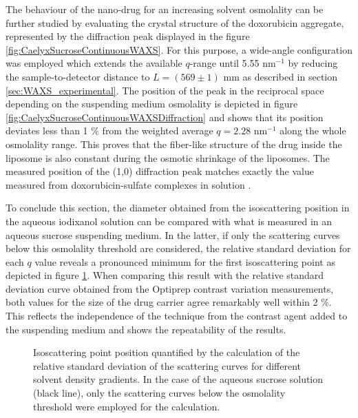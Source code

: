 The behaviour of the nano-drug for an increasing solvent osmolality can be further studied by evaluating the crystal structure of the doxorubicin aggregate, represented by the diffraction peak displayed in the figure \ref{fig:CaelyxSucroseContinuousWAXS}. For this purpose, a wide-angle configuration was employed which extends the available $q$-range until 5.55 nm$^{-1}$ by reducing the sample-to-detector distance to $L = (569 \pm  1)$ mm as described in section \ref{sec:WAXS_experimental}. The position of the peak in the reciprocal space depending on the suspending medium osmolality is depicted in figure \ref{fig:CaelyxSucroseContinuousWAXSDiffraction} and shows that its position deviates less than 1 $\%$ from the weighted average $q=2.28$ nm$^{-1}$ along the whole osmolality range. This proves that the fiber-like structure of the drug inside the liposome is also constant during the osmotic shrinkage of the liposomes. The measured position of the (1,0) diffraction peak matches exactly the value measured from doxorubicin-sulfate complexes in solution \citep{lasic_gelation_1992}. 

To conclude this section, the diameter obtained from the isoscattering position in the aqueous iodixanol solution can be compared with what is measured in an aqueous sucrose suspending medium. In the latter, if only the scattering curves below this osmolality threshold are considered, the relative standard deviation for each $q$ value reveals a pronounced minimum for the first isoscattering point as depicted in figure \ref{fig:CaelyxIsopointComparison}. When comparing this result with the relative standard deviation curve obtained from the Optiprep contrast variation measurements, both values for the size of the drug carrier agree remarkably well within 2 $\%$. This reflects the independence of the technique from the contrast agent added to the suspending medium and shows the repeatability of the results.

\begin{figure}
	\centering
		
		\caption[Isoscattering point position of Caelyx with different solvents.]{Isoscattering point position quantified by the calculation of the relative standard deviation of the scattering curves for different solvent density gradients. In the case of the aqueous sucrose solution (black line), only the scattering curves below the osmolality threshold were employed for the calculation.}
		\label{fig:CaelyxIsopointComparison}
\end{figure}

